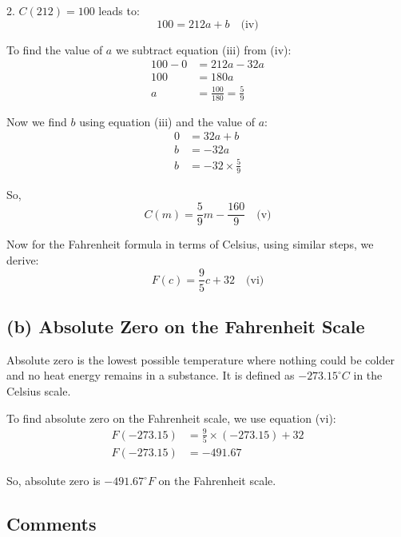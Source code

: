 \documentclass[12pt]{article}
\begin{document}
2. \(C(212) = 100\) leads to:
\begin{equation}
    100 = 212a + b \quad \text{(iv)}
\end{equation}

To find the value of \(a\) we subtract equation (iii) from (iv):
\begin{align*}
    100 - 0 &= 212a - 32a \\
    100 &= 180a \\
    a &= \frac{100}{180} = \frac{5}{9}
\end{align*}

Now we find \(b\) using equation (iii) and the value of \(a\):
\begin{align*}
    0 &= 32a + b \\
    b &= -32a \\
    b &= -32 \times \frac{5}{9}
\end{align*}

So, 
\begin{equation}
    C(m) = \frac{5}{9}m - \frac{160}{9} \quad \text{(v)}
\end{equation}

Now for the Fahrenheit formula in terms of Celsius, using similar steps, we derive:
\begin{equation}
    F(c) = \frac{9}{5}c + 32 \quad \text{(vi)}
\end{equation}

\subsection*{(b) Absolute Zero on the Fahrenheit Scale}

Absolute zero is the lowest possible temperature where nothing could be colder and no heat energy remains in a substance. It is defined as \(-273.15^\circ C\) in the Celsius scale.

To find absolute zero on the Fahrenheit scale, we use equation (vi):
\begin{align*}
    F(-273.15) &= \frac{9}{5} \times (-273.15) + 32 \\
    F(-273.15) &= -491.67
\end{align*}

So, absolute zero is \(-491.67^\circ F\) on the Fahrenheit scale.

\subsection*{Comments}
\end{document}
